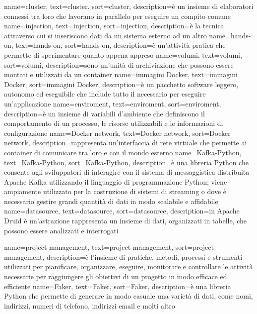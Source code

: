 {
    name={cluster},
    text=cluster,
    sort=cluster,
    description={è un insieme di elaboratori connessi tra loro che lavorano in parallelo per eseguire un compito comune}
}
{
    name={injection},
    text=injection,
    sort=injection,
    description={è la tecnica attraverso cui si inseriscono dati da un sistema esterno ad un altro}
}
{
    name={hands-on},
    text=hands-on,
    sort=hands-on,
    description={è un'attività pratica che permette di sperimentare quanto appena appreso}
}
{
    name={volumi},
    text=volumi,
    sort=volumi,
    description={sono un'unità di archiviazione che possono essere montati e utilizzati da un container}
}
{
    name={immagini Docker},
    text=immagini Docker,
    sort=immagini Docker,
    description={è un pacchetto software leggero, autonomo ed eseguibile che include tutto il necessario per eseguire un'applicazione}
}
{
    name={enviroment},
    text=enviroment,
    sort=enviroment,
    description={è un insieme di variabili d'ambiente che definiscono il comportamento di un processo, le risorse utilizzabili e le informazioni di configurazione}
}
{
    name={Docker network},
    text=Docker network,
    sort=Docker network,
    description={rappresenta un'interfaccia di rete virtuale che permette ai container di comunicare tra loro e con il mondo esterno}
}
{
    name={Kafka-Python},
    text=Kafka-Python,
    sort=Kafka-Python,
    description={è una libreria Python che consente agli sviluppatori di interagire con il sistema di messaggistica distribuita Apache Kafka utilizzando il linguaggio di programmazione Python; viene ampiamente utilizzato per la costruzione di sistemi di streaming o dove è necessario gestire grandi quantità di dati in modo scalabile e affidabile}
}
{
    name={datasource},
    text=datasource,
    sort=datasource,
    description={in Apache Druid è un'astrazione rappresenta un insieme di dati, organizzati in tabelle, che possono essere analizzati e interrogati}
}

{
    name={project management},
    text=project management,
    sort=project management,
    description={è l'insieme di pratiche, metodi, processi e strumenti utilizzati per pianificare, organizzare, eseguire, monitorare e controllare le attività necessarie per raggiungere gli obiettivi di un progetto in modo efficace ed efficiente}
}
{
    name={Faker},
    text=Faker,
    sort=Faker,
    description={è una libreria Python che permette di generare in modo casuale una varietà di dati, come nomi, indirizzi, numeri di telefono, indirizzi email e molti altro}
}